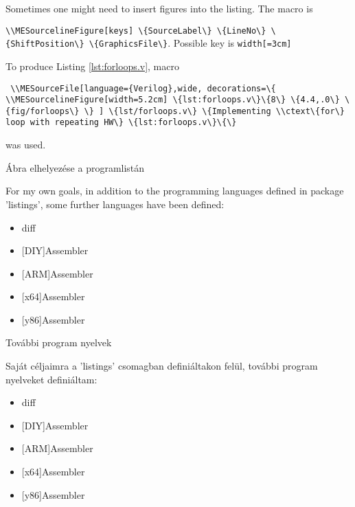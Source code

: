 {
Sometimes one might need to insert figures into the listing.
The macro is
\par\noindent\lstinline|\\MESourcelineFigure[keys] \{SourceLabel\} \{LineNo\} \{ShiftPosition\} \{GraphicsFile\}|.
Possible key is \lstinline|width[=3cm]|

To produce Listing \ref{lst:forloops.v},
 macro
\par\noindent\lstinline|
\\MESourceFile[language={Verilog},wide,
decorations=\{
\\MESourcelineFigure[width=5.2cm] \{lst:forloops.v\}\{8\} \{4.4,.0\} \{fig/forloops\}
\}
] \{lst/forloops.v\} \{Implementing \\ctext\{for\} loop with repeating HW\} \{lst:forloops.v\}\{\}|
\par\noindent was used.

}
{Ábra elhelyezése a programlistán}
{
}


{ For my own goals, in addition to the programming languages
defined in package 'listings', some further languages
have been defined:
\begin{itemize}
\item diff
\item {[DIY]Assembler}
\item {[ARM]Assembler}
\item {[x64]Assembler}
\item {[y86]Assembler}
\end{itemize}
}
{További program nyelvek}
{
Saját céljaimra a 'listings' csomagban definiáltakon felül,
további program nyelveket definiáltam:
\begin{itemize}
\item diff
\item {[DIY]Assembler}
\item {[ARM]Assembler}
\item {[x64]Assembler}
\item {[y86]Assembler}
\end{itemize}
}